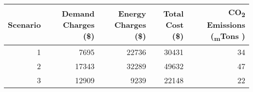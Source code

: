 \begin{tabular}{rrrrr}
\toprule
 Scenario &  Demand Charges (\$) &  Energy Charges (\$) &  Total Cost (\$) &  CO\textsubscript{2} Emissions (\textsubscript{m}Tons )\\
\midrule
        1 &                7695 &               22736 &           30431 &         34 \\
        2 &               17343 &               32289 &           49632 &         47 \\
        3 &               12909 &                9239 &           22148 &         22 \\
\bottomrule
\end{tabular}
